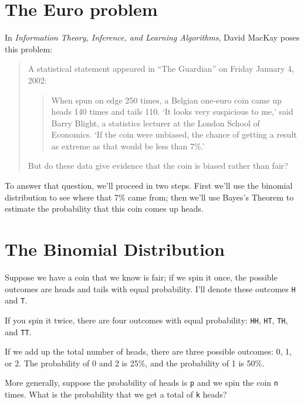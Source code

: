 \documentclass[12pt]{book}
\theoremstyle{exercise}
\newcommand{\py}[1]{{\tt #1}}%
\begin{document}


\section{The Euro problem}
\label{euro}

In {\it Information Theory, Inference, and Learning Algorithms}, David MacKay poses this problem:

\begin{quote}
A statistical statement appeared in ``The Guardian'' on Friday January 4, 2002:

  \begin{quote}
        When spun on edge 250 times, a Belgian one-euro coin came
        up heads 140 times and tails 110.  `It looks very suspicious
        to me,' said Barry Blight, a statistics lecturer at the London
        School of Economics.  `If the coin were unbiased, the chance of
        getting a result as extreme as that would be less than 7\%.'
        \end{quote}

But do these data give evidence that the coin is biased rather than fair?
\end{quote}

To answer that question, we'll proceed in two steps.
First we'll use the binomial distribution to see where that 7\% came from; then we'll use Bayes's Theorem to estimate the probability that this coin comes up heads.


\section{The Binomial Distribution}
\label{binomial}

Suppose we have a coin that we know is fair; if we spin it once, the possible outcomes are heads and tails with equal probability.
I'll denote these outcomes \py{H} and \py{T}.

If you spin it twice, there are four outcomes with equal probability: \py{HH}, \py{HT}, \py{TH}, and \py{TT}.

If we add up the total number of heads, there are three possible outcomes: 0, 1, or 2.  The probability of 0 and 2 is 25\%, and the probability of 1 is 50\%.

More generally, suppose the probability of heads is \py{p} and we spin the coin \py{n} times.  What is the probability that we get a total of \py{k} heads?
\end{document}
